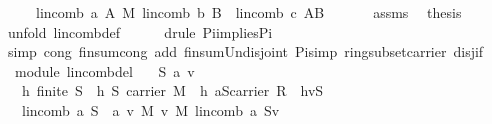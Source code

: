 \begin{isabellebody}
\ \ \ \ {\isacharparenleft}\ {\isachardoublequoteopen}lincomb\ a\ A\ {\isasymoplus}\isactrlbsub M\isactrlesub \ lincomb\ b\ B\ {\isacharequal}\ lincomb\ {\isacharquery}c\ {\isacharparenleft}A{\isasymunion}B{\isacharparenright}{\isachardoublequoteclose}{\isacharparenright}\isanewline
%
\isadelimproof
%
\endisadelimproof
%
\isatagproof
{}\isamarkupfalse%
\ {\isacharminus}\ \isanewline
\ \ \isamarkupfalse%
\ assms\ \isamarkupfalse%
\ {\isacharquery}thesis\isanewline
\ \ \ \ \isamarkupfalse%
\ {\isacharparenleft}unfold\ lincomb{\isacharunderscore}def{\isacharparenright}\isanewline
\ \ \ \ \isamarkupfalse%
\ {\isacharparenleft}drule\ Pi{\isacharunderscore}implies{\isacharunderscore}Pi{}{\isacharparenright}{\isacharplus}\isanewline
\ \ \ \ \isamarkupfalse%
\ {\isacharparenleft}simp\ cong{\isacharcolon}\ finsum{\isacharunderscore}cong{}\ add{\isacharcolon}\ finsum{\isacharunderscore}Un{\isacharunderscore}disjoint\ Pi{\isacharunderscore}simp\ ring{\isacharunderscore}subset{\isacharunderscore}carrier\ disj{\isacharunderscore}if{\isacharparenright}\isanewline
{}\isamarkupfalse%
%
\endisatagproof
{\isafoldproof}%
%
\isadelimproof
\isanewline
%
\endisadelimproof
\isanewline
{}\isamarkupfalse%
\ {\isacharparenleft}\ module{\isacharparenright}\ lincomb{\isacharunderscore}del{}{\isacharcolon}\isanewline
\ \ \ S\ a\ v\isanewline
\ \ \ h{}{\isacharcolon}\ {\isachardoublequoteopen}finite\ S{\isachardoublequoteclose}\ \ h{}{\isacharcolon}\ {\isachardoublequoteopen}S{\isasymsubseteq}\ carrier\ M{\isachardoublequoteclose}\ \ h{}{\isacharcolon}\ {\isachardoublequoteopen}a{\isasymin}{\isacharparenleft}S{\isasymrightarrow}carrier\ R{\isacharparenright}{\isachardoublequoteclose}\ \ h{}{\isacharcolon}{\isachardoublequoteopen}v{\isasymin}S{\isachardoublequoteclose}\isanewline
\ \ \ {\isachardoublequoteopen}lincomb\ a\ S\ {\isacharequal}\ {\isacharparenleft}{\isacharparenleft}a\ v{\isacharparenright}\ {\isasymodot}\isactrlbsub M\isactrlesub \ v{\isacharparenright}\ {\isasymoplus}\isactrlbsub M\isactrlesub \ lincomb\ a\ {\isacharparenleft}S{\isacharminus}{\isacharbraceleft}v{\isacharbraceright}{\isacharparenright}{\isachardoublequoteclose}\isanewline
%
\isadelimproof
%
\endisadelimproof
%
\isatagproof
{}\isamarkupfalse%
\ {\isacharminus}\ \isanewline

\end{isabellebody}
